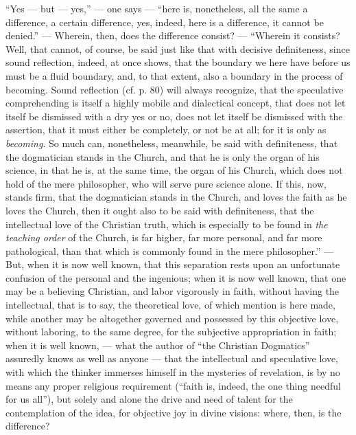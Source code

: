 \documentclass[12pt]{book}
\begin{document}
``Yes --- but --- yes,'' --- one says --- ``here is, nonetheless, all the same a difference, a certain difference, yes, indeed, here is a difference, it cannot be denied.'' --- Wherein, then, does the difference consist? --- ``Wherein it consists? Well, that cannot, of course, be said just like that with decisive definiteness, since sound reflection, indeed, at once shows, that the boundary we here have before us must be a fluid boundary, and, to that extent, also a boundary in the process of becoming. Sound reflection (cf. p. 80) will always recognize, that the speculative comprehending is itself a highly mobile and dialectical concept, that does not let itself be dismissed with a dry yes or no, does not let itself be dismissed with the assertion, that it must either be completely, or not be at all; for it is only as \emph{becoming}. So much can, nonetheless, meanwhile, be said with definiteness, that the dogmatician stands in the Church, and that he
is only the organ of his science, in that he is, at the same time, the organ of his Church, which does not hold of the mere philosopher, who will serve pure science alone. If this, now, stands firm, that the dogmatician stands in the Church, and loves the faith as he loves the Church, then it ought also to be said with definiteness, that the intellectual love of the Christian truth, which is especially to be found in \emph{the teaching order} of the Church, is far higher, far more personal, and far more pathological, than that which is commonly found in the mere philosopher.'' --- But, when it is now well known, that this separation rests upon an unfortunate confusion
of the personal and the ingenious; when it is now well known, that one may be a believing Christian, and labor vigorously in faith, without having the intellectual, that is to say, the theoretical love, of which mention is here made, while another may be altogether governed and possessed by this objective love, without laboring, to the same degree, for the subjective appropriation in faith; when it is well known, --- what the author of ``the Christian Dogmatics'' assuredly knows as well as anyone --- that the intellectual and speculative love, with which the thinker immerses himself in the mysteries of revelation, is by no means any proper religious requirement (``faith is, indeed, the one thing needful for us all''), but solely and alone the drive and need of talent for the contemplation of the idea, for objective joy in divine visions: where, then, is the difference?
\end{document}
